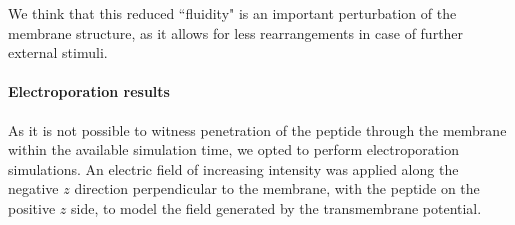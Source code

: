 We think that this reduced ``fluidity" is an important perturbation of the membrane structure, as it allows for less rearrangements in case of further external stimuli.


\paragraph{Electroporation results}
As it is not possible to witness penetration of the peptide through the membrane within the available simulation time, we opted to perform electroporation simulations.
%
An electric field of increasing intensity was applied along the negative $z$ direction perpendicular to the membrane, with the peptide on the positive $z$ side, to model the field generated by the transmembrane potential.
%


